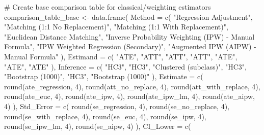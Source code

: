 \documentclass[
  letterpaper,
  DIV=11,
  numbers=noendperiod]{scrartcl}
\newenvironment{Shaded}{\begin{snugshade}}{\end{snugshade}}
\newcommand{\AttributeTok}[1]{\textcolor[rgb]{0.40,0.45,0.13}{#1}}
\newcommand{\CommentTok}[1]{\textcolor[rgb]{0.37,0.37,0.37}{#1}}
\newcommand{\DecValTok}[1]{\textcolor[rgb]{0.68,0.00,0.00}{#1}}
\newcommand{\FunctionTok}[1]{\textcolor[rgb]{0.28,0.35,0.67}{#1}}
\newcommand{\NormalTok}[1]{\textcolor[rgb]{0.00,0.23,0.31}{#1}}
\newcommand{\OtherTok}[1]{\textcolor[rgb]{0.00,0.23,0.31}{#1}}
\newcommand{\StringTok}[1]{\textcolor[rgb]{0.13,0.47,0.30}{#1}}
\begin{document}
\begin{Shaded}
\begin{Highlighting}[]
\CommentTok{\# Create base comparison table for classical/weighting estimators}
\NormalTok{comparison\_table\_base }\OtherTok{\textless{}{-}} \FunctionTok{data.frame}\NormalTok{(}
  \AttributeTok{Method =} \FunctionTok{c}\NormalTok{(}
    \StringTok{"Regression Adjustment"}\NormalTok{,}
    \StringTok{"Matching (1:1 No Replacement)"}\NormalTok{,}
    \StringTok{"Matching (1:1 With Replacement)"}\NormalTok{,}
    \StringTok{"Euclidean Distance Matching"}\NormalTok{,}
    \StringTok{"Inverse Probability Weighting (IPW) {-} Manual Formula"}\NormalTok{,}
    \StringTok{"IPW Weighted Regression (Secondary)"}\NormalTok{,}
    \StringTok{"Augmented IPW (AIPW) {-} Manual Formula"}
\NormalTok{  ),}
  \AttributeTok{Estimand =} \FunctionTok{c}\NormalTok{(}
    \StringTok{"ATE"}\NormalTok{,}
    \StringTok{"ATT"}\NormalTok{,}
    \StringTok{"ATT"}\NormalTok{,}
    \StringTok{"ATT"}\NormalTok{,}
    \StringTok{"ATE"}\NormalTok{,}
    \StringTok{"ATE"}\NormalTok{,}
    \StringTok{"ATE"}
\NormalTok{  ),}
  \AttributeTok{Inference =} \FunctionTok{c}\NormalTok{(}
    \StringTok{"HC3"}\NormalTok{,}
    \StringTok{"HC3"}\NormalTok{,}
    \StringTok{"Clustered (subclass)"}\NormalTok{,}
    \StringTok{"HC3"}\NormalTok{,}
    \StringTok{"Bootstrap (1000)"}\NormalTok{,}
    \StringTok{"HC3"}\NormalTok{,}
    \StringTok{"Bootstrap (1000)"}
\NormalTok{  ),}
  \AttributeTok{Estimate =} \FunctionTok{c}\NormalTok{(}
    \FunctionTok{round}\NormalTok{(ate\_regression, }\DecValTok{4}\NormalTok{),}
    \FunctionTok{round}\NormalTok{(att\_no\_replace, }\DecValTok{4}\NormalTok{),}
    \FunctionTok{round}\NormalTok{(att\_with\_replace, }\DecValTok{4}\NormalTok{),}
    \FunctionTok{round}\NormalTok{(ate\_euc, }\DecValTok{4}\NormalTok{),}
    \FunctionTok{round}\NormalTok{(ate\_ipw, }\DecValTok{4}\NormalTok{),}
    \FunctionTok{round}\NormalTok{(ate\_ipw\_lm, }\DecValTok{4}\NormalTok{),}
    \FunctionTok{round}\NormalTok{(ate\_aipw, }\DecValTok{4}\NormalTok{)}
\NormalTok{  ),}
  \AttributeTok{Std\_Error =} \FunctionTok{c}\NormalTok{(}
    \FunctionTok{round}\NormalTok{(se\_regression, }\DecValTok{4}\NormalTok{),}
    \FunctionTok{round}\NormalTok{(se\_no\_replace, }\DecValTok{4}\NormalTok{),}
    \FunctionTok{round}\NormalTok{(se\_with\_replace, }\DecValTok{4}\NormalTok{),}
    \FunctionTok{round}\NormalTok{(se\_euc, }\DecValTok{4}\NormalTok{),}
    \FunctionTok{round}\NormalTok{(se\_ipw, }\DecValTok{4}\NormalTok{),}
    \FunctionTok{round}\NormalTok{(se\_ipw\_lm, }\DecValTok{4}\NormalTok{),}
    \FunctionTok{round}\NormalTok{(se\_aipw, }\DecValTok{4}\NormalTok{)}
\NormalTok{  ),}
  \AttributeTok{CI\_Lower =} \FunctionTok{c}\NormalTok{(}

\end{Highlighting}
\end{Shaded}
\end{document}
